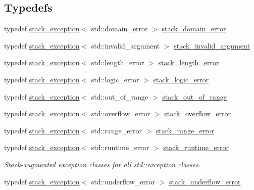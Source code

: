 \subsection*{Typedefs}
\begin{DoxyCompactItemize}
\item 
typedef \mbox{\hyperlink{classstacktrace_1_1stack__exception}{stack\+\_\+exception}}$<$ std\+::domain\+\_\+error $>$ \mbox{\hyperlink{namespacestacktrace_a771214c95a49f1ddd0fb6c4db59dde48}{stack\+\_\+domain\+\_\+error}}
\item 
typedef \mbox{\hyperlink{classstacktrace_1_1stack__exception}{stack\+\_\+exception}}$<$ std\+::invalid\+\_\+argument $>$ \mbox{\hyperlink{namespacestacktrace_a74f896665132033291fe2947451b3c9e}{stack\+\_\+invalid\+\_\+argument}}
\item 
typedef \mbox{\hyperlink{classstacktrace_1_1stack__exception}{stack\+\_\+exception}}$<$ std\+::length\+\_\+error $>$ \mbox{\hyperlink{namespacestacktrace_ae0dda3906c2aadaa3ebbd8214edefd42}{stack\+\_\+length\+\_\+error}}
\item 
typedef \mbox{\hyperlink{classstacktrace_1_1stack__exception}{stack\+\_\+exception}}$<$ std\+::logic\+\_\+error $>$ \mbox{\hyperlink{namespacestacktrace_ad98db3c686d909b428d0e52b94bfd5f2}{stack\+\_\+logic\+\_\+error}}
\item 
typedef \mbox{\hyperlink{classstacktrace_1_1stack__exception}{stack\+\_\+exception}}$<$ std\+::out\+\_\+of\+\_\+range $>$ \mbox{\hyperlink{namespacestacktrace_a34ce6236709f71cf3c8464d9c1ba759e}{stack\+\_\+out\+\_\+of\+\_\+range}}
\item 
typedef \mbox{\hyperlink{classstacktrace_1_1stack__exception}{stack\+\_\+exception}}$<$ std\+::overflow\+\_\+error $>$ \mbox{\hyperlink{namespacestacktrace_aac4efddfe0896c669f9c51ea526b3826}{stack\+\_\+overflow\+\_\+error}}
\item 
typedef \mbox{\hyperlink{classstacktrace_1_1stack__exception}{stack\+\_\+exception}}$<$ std\+::range\+\_\+error $>$ \mbox{\hyperlink{namespacestacktrace_ae0f1c03cd8a7ed8fb41381a04825aaf7}{stack\+\_\+range\+\_\+error}}
\item 
typedef \mbox{\hyperlink{classstacktrace_1_1stack__exception}{stack\+\_\+exception}}$<$ std\+::runtime\+\_\+error $>$ \mbox{\hyperlink{namespacestacktrace_a79b82ab6e60429fbb295122c4e740d83}{stack\+\_\+runtime\+\_\+error}}
\begin{DoxyCompactList}\small\item\em Stack-\/augmented exception classes for all std\+::exception classes. \end{DoxyCompactList}\item 
typedef \mbox{\hyperlink{classstacktrace_1_1stack__exception}{stack\+\_\+exception}}$<$ std\+::underflow\+\_\+error $>$ \mbox{\hyperlink{namespacestacktrace_aaef0a4d9cce48504f61bacbb2d6293a0}{stack\+\_\+underflow\+\_\+error}}
\end{DoxyCompactItemize}
